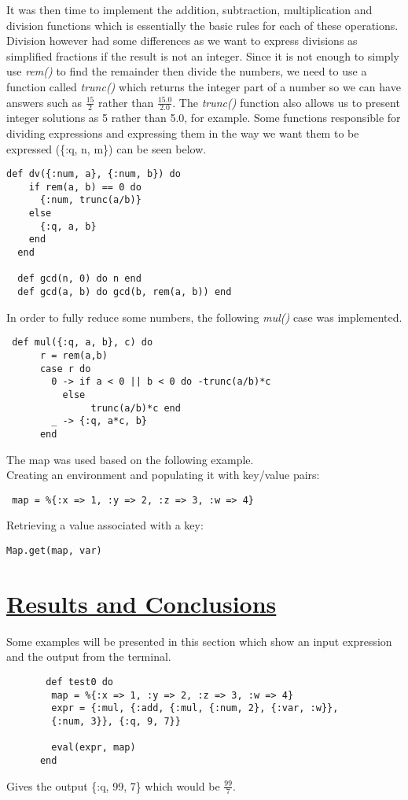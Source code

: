 \documentclass[a4paper,11pt]{article}
\begin{document}
It was then time to implement the addition, subtraction, multiplication and division functions which is essentially the basic rules for each of these operations. Division however had some differences as we want to express divisions as simplified fractions if the result is not an integer. Since it is not enough to simply use \textit{rem()} to find the remainder then divide the numbers, we need to use a function called \textit{trunc()} which returns the integer part of a number so we can have answers such as $\frac{15}{2}$ rather than $\frac{15.0}{2.0}$. The \textit{trunc()} function also allows us to present integer solutions as 5 rather than 5.0, for example. Some functions responsible for dividing expressions and expressing them in the way we want them to be expressed (\{:q, n, m\}) can be seen below.
\begin{verbatim}
def dv({:num, a}, {:num, b}) do
    if rem(a, b) == 0 do
      {:num, trunc(a/b)}
    else
      {:q, a, b}
    end
  end
  
  def gcd(n, 0) do n end
  def gcd(a, b) do gcd(b, rem(a, b)) end

  \end{verbatim}
In order to fully reduce some numbers, the following \textit{mul()} case was implemented.
\begin{verbatim}
 def mul({:q, a, b}, c) do
      r = rem(a,b)
      case r do
        0 -> if a < 0 || b < 0 do -trunc(a/b)*c
          else
               trunc(a/b)*c end
        _ -> {:q, a*c, b}
      end
      \end{verbatim}
The map was used based on the following example.\\

Creating an environment and populating it with key/value pairs:
\begin{verbatim}
 map = %{:x => 1, :y => 2, :z => 3, :w => 4}
 \end{verbatim}

Retrieving a value associated with a key:
\begin{verbatim}
Map.get(map, var)
\end{verbatim}

\section*{
	\underline{Results and Conclusions}
}
Some examples will be presented in this section which show an input expression and the output from the terminal.
\begin{verbatim}
       def test0 do
        map = %{:x => 1, :y => 2, :z => 3, :w => 4}
        expr = {:mul, {:add, {:mul, {:num, 2}, {:var, :w}}, 
        {:num, 3}}, {:q, 9, 7}}

        eval(expr, map)
      end
\end{verbatim}
Gives the output \{:q, 99, 7\} which would be $\frac{99}{7}$.
\end{document}
